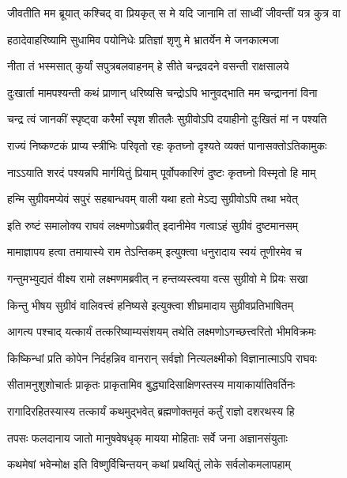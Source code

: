 \twolineshloka
{जीवतीति मम ब्रूयात् कश्चिद् वा प्रियकृत् स मे}
{यदि जानामि तां साध्वीं जीवन्तीं यत्र कुत्र वा} %

\twolineshloka
{हठादेवाहरिष्यामि सुधामिव पयोनिधेः}
{प्रतिज्ञां शृणु मे भ्रातर्येन मे जनकात्मजा} %

\twolineshloka
{नीता तं भस्मसात् कुर्यां सपुत्रबलवाहनम्}
{हे सीते चन्द्रवदने वसन्ती राक्षसालये} %

\twolineshloka
{दुःखार्ता मामपश्यन्ती कथं प्राणान् धरिष्यसि}
{चन्द्रोऽपि भानुवद्भाति मम चन्द्राननां विना} %

\twolineshloka
{चन्द्र त्वं जानकीं स्पृष्ट्वा करैर्मां स्पृश शीतलैः}
{सुग्रीवोऽपि दयाहीनो दुःखितं मां न पश्यति} %

\twolineshloka
{राज्यं निष्कण्टकं प्राप्य स्त्रीभिः परिवृतो रहः}
{कृतघ्नो दृश्यते व्यक्तं पानासक्तोऽतिकामुकः} %

\twolineshloka
{नाऽऽयाति शरदं पश्यन्नपि मार्गयितुं प्रियाम्}
{पूर्वोपकारिणं दुष्टः कृतघ्नो विस्मृतो हि माम्} %

\twolineshloka
{हन्मि सुग्रीवमप्येवं सपुरं सहबान्धवम्}
{वाली यथा हतो मेऽद्य सुग्रीवोऽपि तथा भवेत्} %

\twolineshloka
{इति रुष्टं समालोक्य राघवं लक्ष्मणोऽब्रवीत्}
{इदानीमेव गत्वाऽहं सुग्रीवं दुष्टमानसम्} %

\twolineshloka
{मामाज्ञापय हत्वा तमायास्ये राम तेऽन्तिकम्}
{इत्युक्त्वा धनुरादाय स्वयं तूणीरमेव च} %

\twolineshloka
{गन्तुमभ्युद्यतं वीक्ष्य रामो लक्ष्मणमब्रवीत्}
{न हन्तव्यस्त्वया वत्स सुग्रीवो मे प्रियः सखा} %

\twolineshloka
{किन्तु भीषय सुग्रीवं वालिवत्त्वं हनिष्यसे}
{इत्युक्त्वा शीघ्रमादाय सुग्रीवप्रतिभाषितम्} %

\twolineshloka
{आगत्य पश्चाद् यत्कार्यं तत्करिष्याम्यसंशयम्}
{तथेति लक्ष्मणोऽगच्छत्त्वरितो भीमविक्रमः} %

\twolineshloka
{किष्किन्धां प्रति कोपेन निर्दहन्निव वानरान्}
{सर्वज्ञो नित्यलक्ष्मीको विज्ञानात्माऽपि राघवः} %

\twolineshloka
{सीतामनुशुशोचार्तः प्राकृतः प्राकृतामिव}
{बुद्ध्यादिसाक्षिणस्तस्य मायाकार्यातिवर्तिनः} %

\twolineshloka
{रागादिरहितस्यास्य तत्कार्यं कथमुद्भवेत्}
{ब्रह्मणोक्तमृतं कर्तुं राज्ञो दशरथस्य हि} %

\twolineshloka
{तपसः फलदानाय जातो मानुषवेषधृक्}
{मायया मोहिताः सर्वे जना अज्ञानसंयुताः} %

\twolineshloka
{कथमेषां भवेन्मोक्ष इति विष्णुर्विचिन्तयन्}
{कथां प्रथयितुं लोके सर्वलोकमलापहाम्} %

